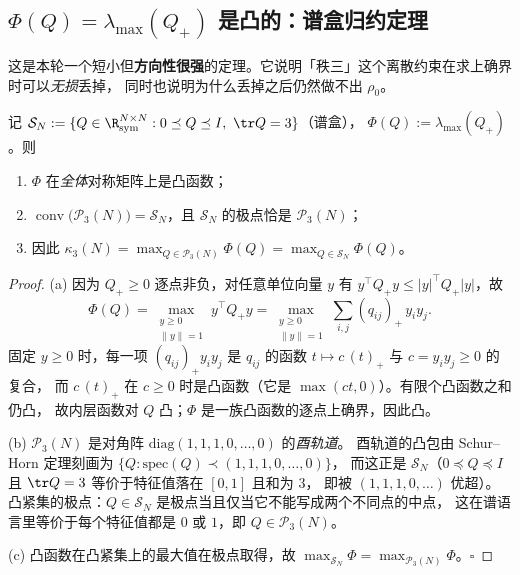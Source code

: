 \subsection{$\Phi(Q)=\lambda_{\max}(Q_+)$ 是凸的：谱盒归约定理}\label{sec:convex}

这是本轮一个短小但\textbf{方向性很强}的定理。它说明「秩三」这个离散约束在求上确界时可以\emph{无损}丢掉，
同时也说明为什么丢掉之后仍然做不出 $\rho_0$。

\begin{theorem}[凸性与谱盒归约，已证]\label{thm:convex}
记 $\mathcal S_N:=\{Q\in\R^{N\times N}_{\rm sym}:0\preceq Q\preceq I,\ \tr Q=3\}$（谱盒），
$\Phi(Q):=\lambda_{\max}(Q_+)$。则
\begin{enumerate}[label=(\alph*),leftmargin=2.2em]
\item $\Phi$ 在\emph{全体}对称矩阵上是凸函数；
\item $\operatorname{conv}\bigl(\mathcal P_3(N)\bigr)=\mathcal S_N$，且 $\mathcal S_N$ 的极点恰是 $\mathcal P_3(N)$；
\item 因此 $\kappa_3(N)=\max_{Q\in\mathcal P_3(N)}\Phi(Q)=\max_{Q\in\mathcal S_N}\Phi(Q)$。
\end{enumerate}
\end{theorem}

\begin{proof}
(a) 因为 $Q_+\ge0$ 逐点非负，对任意单位向量 $y$ 有 $y^\top Q_+y\le|y|^\top Q_+|y|$，故
\[
\Phi(Q)=\max_{\substack{y\ge0\\ \|y\|=1}}y^\top Q_+y=\max_{\substack{y\ge0\\ \|y\|=1}}\sum_{i,j}(q_{ij})_+\,y_iy_j .
\]
固定 $y\ge0$ 时，每一项 $(q_{ij})_+y_iy_j$ 是 $q_{ij}$ 的函数 $t\mapsto c\,(t)_+$ 与 $c=y_iy_j\ge0$ 的复合，
而 $c\,(t)_+$ 在 $c\ge0$ 时是凸函数（它是 $\max(ct,0)$）。有限个凸函数之和仍凸，
故内层函数对 $Q$ 凸；$\Phi$ 是一族凸函数的逐点上确界，因此凸。

(b) $\mathcal P_3(N)$ 是对角阵 $\mathrm{diag}(1,1,1,0,\dots,0)$ 的\emph{酉轨道}。
酉轨道的凸包由 Schur--Horn 定理刻画为 $\{Q:\mathrm{spec}(Q)\prec(1,1,1,0,\dots,0)\}$，
而这正是 $\mathcal S_N$（$0\preceq Q\preceq I$ 且 $\tr Q=3$ 等价于特征值落在 $[0,1]$ 且和为 $3$，
即被 $(1,1,1,0,\dots)$ 优超）。凸紧集的极点：$Q\in\mathcal S_N$ 是极点当且仅当它不能写成两个不同点的中点，
这在谱语言里等价于每个特征值都是 $0$ 或 $1$，即 $Q\in\mathcal P_3(N)$。

(c) 凸函数在凸紧集上的最大值在极点取得，故 $\max_{\mathcal S_N}\Phi=\max_{\mathcal P_3(N)}\Phi$。$\square$
\end{proof}

